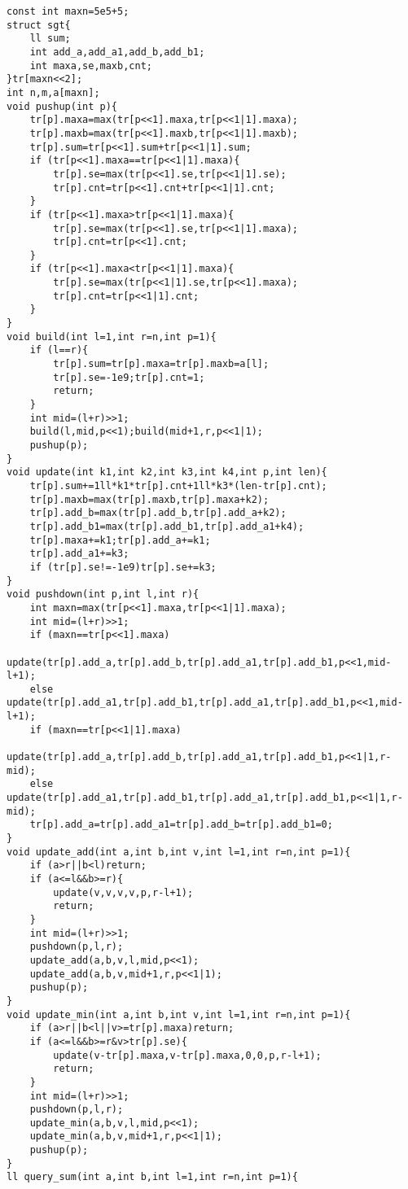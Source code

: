 \documentclass[12pt]{article}
\begin{document}
{{{{{{{{{{{{{{\setmainfont{Consolas}
\begin{lstlisting}
const int maxn=5e5+5;
struct sgt{
    ll sum;
    int add_a,add_a1,add_b,add_b1;
    int maxa,se,maxb,cnt;
}tr[maxn<<2];
int n,m,a[maxn];
void pushup(int p){
    tr[p].maxa=max(tr[p<<1].maxa,tr[p<<1|1].maxa);
    tr[p].maxb=max(tr[p<<1].maxb,tr[p<<1|1].maxb);
    tr[p].sum=tr[p<<1].sum+tr[p<<1|1].sum;
    if (tr[p<<1].maxa==tr[p<<1|1].maxa){
        tr[p].se=max(tr[p<<1].se,tr[p<<1|1].se);
        tr[p].cnt=tr[p<<1].cnt+tr[p<<1|1].cnt;
    }
    if (tr[p<<1].maxa>tr[p<<1|1].maxa){
        tr[p].se=max(tr[p<<1].se,tr[p<<1|1].maxa);
        tr[p].cnt=tr[p<<1].cnt;
    }
    if (tr[p<<1].maxa<tr[p<<1|1].maxa){
        tr[p].se=max(tr[p<<1|1].se,tr[p<<1].maxa);
        tr[p].cnt=tr[p<<1|1].cnt;
    }
}
void build(int l=1,int r=n,int p=1){
    if (l==r){
        tr[p].sum=tr[p].maxa=tr[p].maxb=a[l];
        tr[p].se=-1e9;tr[p].cnt=1;
        return;
    }
    int mid=(l+r)>>1;
    build(l,mid,p<<1);build(mid+1,r,p<<1|1);
    pushup(p);
}
void update(int k1,int k2,int k3,int k4,int p,int len){
    tr[p].sum+=1ll*k1*tr[p].cnt+1ll*k3*(len-tr[p].cnt);
    tr[p].maxb=max(tr[p].maxb,tr[p].maxa+k2);
    tr[p].add_b=max(tr[p].add_b,tr[p].add_a+k2);
    tr[p].add_b1=max(tr[p].add_b1,tr[p].add_a1+k4);
    tr[p].maxa+=k1;tr[p].add_a+=k1;
    tr[p].add_a1+=k3;
    if (tr[p].se!=-1e9)tr[p].se+=k3;
}
void pushdown(int p,int l,int r){
    int maxn=max(tr[p<<1].maxa,tr[p<<1|1].maxa);
    int mid=(l+r)>>1;
    if (maxn==tr[p<<1].maxa)
        update(tr[p].add_a,tr[p].add_b,tr[p].add_a1,tr[p].add_b1,p<<1,mid-l+1);
    else update(tr[p].add_a1,tr[p].add_b1,tr[p].add_a1,tr[p].add_b1,p<<1,mid-l+1);
    if (maxn==tr[p<<1|1].maxa)
        update(tr[p].add_a,tr[p].add_b,tr[p].add_a1,tr[p].add_b1,p<<1|1,r-mid);
    else update(tr[p].add_a1,tr[p].add_b1,tr[p].add_a1,tr[p].add_b1,p<<1|1,r-mid);
    tr[p].add_a=tr[p].add_a1=tr[p].add_b=tr[p].add_b1=0;
}
void update_add(int a,int b,int v,int l=1,int r=n,int p=1){
    if (a>r||b<l)return;
    if (a<=l&&b>=r){
        update(v,v,v,v,p,r-l+1);
        return;
    }
    int mid=(l+r)>>1;
    pushdown(p,l,r);
    update_add(a,b,v,l,mid,p<<1);
    update_add(a,b,v,mid+1,r,p<<1|1);
    pushup(p);
}
void update_min(int a,int b,int v,int l=1,int r=n,int p=1){
    if (a>r||b<l||v>=tr[p].maxa)return;
    if (a<=l&&b>=r&v>tr[p].se){
        update(v-tr[p].maxa,v-tr[p].maxa,0,0,p,r-l+1);
        return;
    }
    int mid=(l+r)>>1;
    pushdown(p,l,r);
    update_min(a,b,v,l,mid,p<<1);
    update_min(a,b,v,mid+1,r,p<<1|1);
    pushup(p);
}
ll query_sum(int a,int b,int l=1,int r=n,int p=1){

\end{lstlisting}}}}}}}}}}}}}}}
\end{document}
